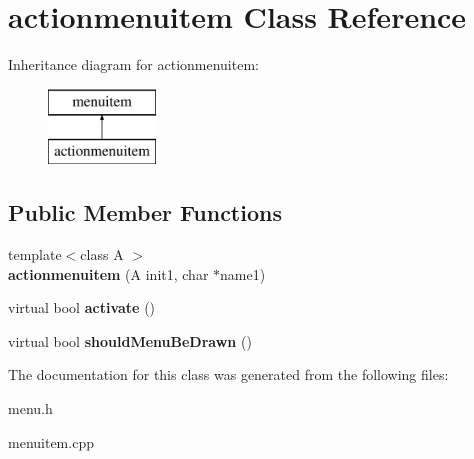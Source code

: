\hypertarget{classactionmenuitem}{\section{actionmenuitem Class Reference}
\label{classactionmenuitem}
}
Inheritance diagram for actionmenuitem\-:\begin{figure}[H]
\begin{center}
\leavevmode
\includegraphics[height=2.000000cm]{classactionmenuitem}
\end{center}
\end{figure}
\subsection*{Public Member Functions}
\begin{DoxyCompactItemize}
\item 
\hypertarget{classactionmenuitem_a78dfdf114ebbfdebc7b983a2b3a7b4ea}{{\footnotesize template$<$class A $>$ }\\{\bfseries actionmenuitem} (A init1, char $\ast$name1)}\label{classactionmenuitem_a78dfdf114ebbfdebc7b983a2b3a7b4ea}

\item 
\hypertarget{classactionmenuitem_a91025817e7fdf766b4f2fae25759bba5}{virtual bool {\bfseries activate} ()}\label{classactionmenuitem_a91025817e7fdf766b4f2fae25759bba5}

\item 
\hypertarget{classactionmenuitem_accaa80b69c19704b420ff35bc044815f}{virtual bool {\bfseries should\-Menu\-Be\-Drawn} ()}\label{classactionmenuitem_accaa80b69c19704b420ff35bc044815f}

\end{DoxyCompactItemize}


The documentation for this class was generated from the following files\-:\begin{DoxyCompactItemize}
\item 
menu.\-h\item 
menuitem.\-cpp\end{DoxyCompactItemize}
